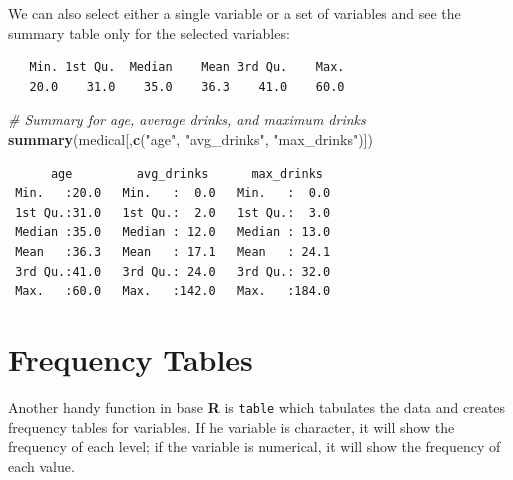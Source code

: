 \documentclass[]{book}
\newenvironment{Shaded}{\begin{snugshade}}{\end{snugshade}}
\newcommand{\CommentTok}[1]{\textcolor[rgb]{0.56,0.35,0.01}{\textit{#1}}}
\newcommand{\KeywordTok}[1]{\textcolor[rgb]{0.13,0.29,0.53}{\textbf{#1}}}
\newcommand{\NormalTok}[1]{#1}
\newcommand{\OperatorTok}[1]{\textcolor[rgb]{0.81,0.36,0.00}{\textbf{#1}}}
\newcommand{\StringTok}[1]{\textcolor[rgb]{0.31,0.60,0.02}{#1}}
\begin{document}
We can also select either a single variable or a set of variables and see the summary table only for the selected variables:

\begin{Shaded}
\end{Shaded}

\begin{verbatim}
   Min. 1st Qu.  Median    Mean 3rd Qu.    Max. 
   20.0    31.0    35.0    36.3    41.0    60.0 
\end{verbatim}

\begin{Shaded}
\begin{Highlighting}[]
\CommentTok{# Summary for age, average drinks, and maximum drinks}
\KeywordTok{summary}\NormalTok{(medical[,}\KeywordTok{c}\NormalTok{(}\StringTok{"age"}\NormalTok{, }\StringTok{"avg_drinks"}\NormalTok{, }\StringTok{"max_drinks"}\NormalTok{)])}
\end{Highlighting}
\end{Shaded}

\begin{verbatim}
      age         avg_drinks      max_drinks   
 Min.   :20.0   Min.   :  0.0   Min.   :  0.0  
 1st Qu.:31.0   1st Qu.:  2.0   1st Qu.:  3.0  
 Median :35.0   Median : 12.0   Median : 13.0  
 Mean   :36.3   Mean   : 17.1   Mean   : 24.1  
 3rd Qu.:41.0   3rd Qu.: 24.0   3rd Qu.: 32.0  
 Max.   :60.0   Max.   :142.0   Max.   :184.0  
\end{verbatim}

\hypertarget{frequency-tables}{%
\section{Frequency Tables}\label{frequency-tables}}

Another handy function in base \textbf{R} is \texttt{table} which tabulates the data and creates frequency tables for variables. If he variable is character, it will show the frequency of each level; if the variable is numerical, it will show the frequency of each value.

\begin{Shaded}
\end{Shaded}
\end{document}
